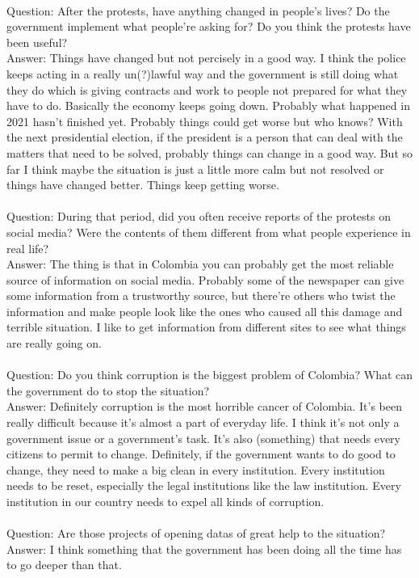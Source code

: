 \documentclass{phyasgn}\usepackage{nag}
\begin{document}
\\
Question: After the protests, have anything changed in people’s lives? Do the government implement what people’re asking for? Do you think the protests have been useful?\\
Answer: Things have changed but not percisely in a good way. I think the police keeps acting in a really un(?)lawful way and the government is still doing what they do which is giving contracts and work to people not prepared for what they have to do. Basically the economy keeps going down. Probably what happened in 2021 hasn’t finished yet. Probably things could get worse but who knows? With the next presidential election, if the president is a person that can deal with the matters that need to be solved, probably things can change in a good way. But so far I think maybe the situation is just a little more calm but not resolved or things have changed better. Things keep getting worse.\\
\\
Question: During that period, did you often receive reports of the protests on social media? Were the contents of them different from what people experience in real life?\\
Answer: The thing is that in Colombia you can probably get the most reliable source of information on social media. Probably some of the newspaper can give some information from a trustworthy source, but there’re others who twist the information and make people look like the ones who caused all this damage and terrible situation. I like to get information from different sites to see what things are really going on. \\
\\
Question: Do you think corruption is the biggest problem of Colombia? What can the government do to stop the situation?\\
Answer: Definitely corruption is the most horrible cancer of Colombia. It’s been really difficult because it’s almost a part of everyday life. I think it’s not only a government issue or a government’s task. It’s also (something) that needs every citizens to permit to change. Definitely, if the government wants to do good to change, they need to make a big clean in every institution. Every institution needs to be reset, especially the legal institutions like the law institution. Every institution in our country needs to expel all kinds of corruption.\\
\\
Question: Are those projects of opening datas of great help to the situation?\\
Answer: I think something that the government has been doing all the time has to go deeper than that.\\
\end{document}
